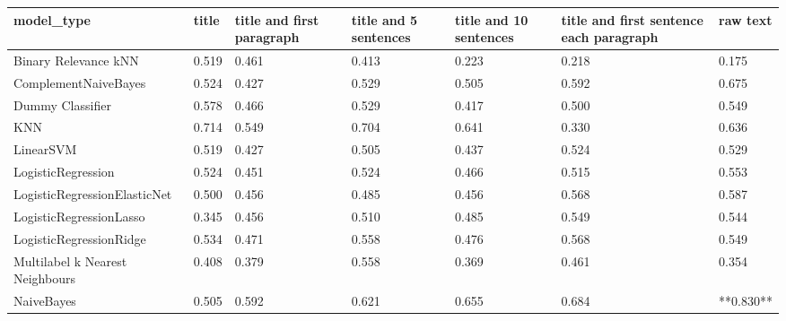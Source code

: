 \begin{tabular}{lllllll}
\toprule
                     model\_type & title & title and first paragraph & title and 5 sentences & title and 10 sentences & title and first sentence each paragraph &  raw text \\
\midrule
           Binary Relevance kNN & 0.519 &                     0.461 &                 0.413 &                  0.223 &                                   0.218 &     0.175 \\
           ComplementNaiveBayes & 0.524 &                     0.427 &                 0.529 &                  0.505 &                                   0.592 &     0.675 \\
               Dummy Classifier & 0.578 &                     0.466 &                 0.529 &                  0.417 &                                   0.500 &     0.549 \\
                            KNN & 0.714 &                     0.549 &                 0.704 &                  0.641 &                                   0.330 &     0.636 \\
                      LinearSVM & 0.519 &                     0.427 &                 0.505 &                  0.437 &                                   0.524 &     0.529 \\
             LogisticRegression & 0.524 &                     0.451 &                 0.524 &                  0.466 &                                   0.515 &     0.553 \\
   LogisticRegressionElasticNet & 0.500 &                     0.456 &                 0.485 &                  0.456 &                                   0.568 &     0.587 \\
        LogisticRegressionLasso & 0.345 &                     0.456 &                 0.510 &                  0.485 &                                   0.549 &     0.544 \\
        LogisticRegressionRidge & 0.534 &                     0.471 &                 0.558 &                  0.476 &                                   0.568 &     0.549 \\
Multilabel k Nearest Neighbours & 0.408 &                     0.379 &                 0.558 &                  0.369 &                                   0.461 &     0.354 \\
                     NaiveBayes & 0.505 &                     0.592 &                 0.621 &                  0.655 &                                   0.684 & **0.830** \\

\end{tabular}
